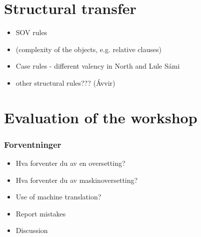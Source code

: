 \documentclass{beamer}
\begin{document}
\section{Structural transfer} 
\begin{frame}
\begin{itemize}
  \item SOV rules
  \item (complexity of the objects, e.g. relative clauses)
  \item Case rules - different valency in North and Lule Sámi
  \item other structural rules??? (Ávvir)
\end{itemize}
\end{frame}


\section{Evaluation of the workshop}

\begin{frame}\frametitle{Forventninger}  
\begin{itemize}
\item Hva forventer du av en oversetting? \pause
\item Hva forventer du av maskinoversetting?
\end{itemize}
\end{frame}

\begin{frame}
\begin{itemize}
\item Use of machine translation? 
\item Report mistakes
\item Discussion
\end{itemize}
\end{frame}
\end{document}
